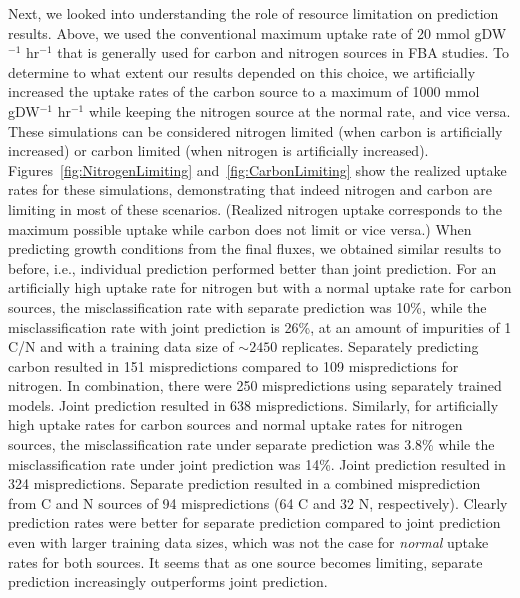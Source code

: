 \documentclass[12pt]{article}
\begin{document}
Next, we looked into understanding the role of resource limitation on prediction results. Above, we used the conventional maximum uptake rate of 20 mmol gDW$^{-1}$ hr$^{-1}$ that is generally used for carbon and nitrogen sources in FBA studies. To determine to what extent our results depended on this choice, we artificially increased the uptake rates of the carbon source to a maximum of 1000 mmol gDW$^{-1}$ hr$^{-1}$ while keeping the nitrogen source at the normal rate, and vice versa. These simulations can be considered nitrogen limited (when carbon is artificially increased) or carbon limited (when nitrogen is artificially increased). Figures~\ref{fig:NitrogenLimiting} and~\ref{fig:CarbonLimiting} show the realized uptake rates for these simulations, demonstrating that indeed nitrogen and carbon are limiting in most of these scenarios. (Realized nitrogen uptake corresponds to the maximum possible uptake while carbon does not limit or vice versa.) When predicting growth conditions from the final fluxes, we obtained similar results to before, i.e., individual prediction performed better than joint prediction. For an artificially high uptake rate for nitrogen but with a normal uptake rate for carbon sources, the misclassification rate with separate prediction was 10\%, while the  misclassification rate with joint prediction is 26\%, at an amount of impurities of 1 C/N and with a training data size of $\mathord{\sim}2450$ replicates. Separately predicting carbon resulted in 151 mispredictions compared to 109 mispredictions for nitrogen. In combination, there were 250 mispredictions using separately trained models. Joint prediction resulted in 638 mispredictions. Similarly, for artificially high uptake rates for carbon sources and normal uptake rates for nitrogen sources, the misclassification rate under separate prediction was 3.8\% while the misclassification rate under joint prediction was 14\%. Joint prediction resulted in 324 mispredictions. Separate prediction resulted in a combined misprediction from C and N sources of 94 mispredictions (64 C and 32 N, respectively). Clearly prediction rates were better for separate prediction compared to joint prediction even with larger training data sizes, which was not the case for \emph{normal} uptake rates for both sources. It seems that as one source becomes limiting, separate prediction increasingly outperforms joint prediction.
\end{document}
